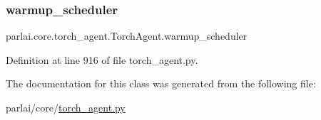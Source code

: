 \subsubsection{\texorpdfstring{warmup\+\_\+scheduler}{warmup\_scheduler}}
{\footnotesize\ttfamily parlai.\+core.\+torch\+\_\+agent.\+Torch\+Agent.\+warmup\+\_\+scheduler}



Definition at line 916 of file torch\+\_\+agent.\+py.



The documentation for this class was generated from the following file\+:\begin{DoxyCompactItemize}
\item 
parlai/core/\hyperlink{torch__agent_8py}{torch\+\_\+agent.\+py}\end{DoxyCompactItemize}
